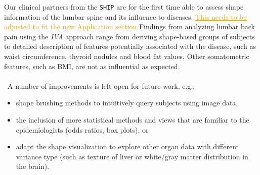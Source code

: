 \documentclass[journal]{style/vgtc} 			          %
\newcommand{\com}[1]{\textcolor{orange}{\uline{#1}}}
\begin{document}
Our clinical partners from the \texttt{SHIP} are for the first time able to assess shape information of the lumbar spine and its influence to diseases.
%
\com{This needs to be adjusted to fit the new Application section}
Findings from analyzing lumbar back pain using the \emph{IVA} approach range from deriving shape-based groups of subjects to detailed description of features potentially associated with the disease, such as waist circumference, thyroid nodules and blood fat values.
%
Other somatometric features, such as BMI, are not as influential as expected.
%
\\\\\
A number of improvements is left open for future work, e.g.,

\begin{itemize}
	\item shape brushing methods to intuitively query subjects using image data,
	\item the inclusion of more statistical methods and views that are familiar to the epidemiologists (odds ratios, box plots), or
	\item adapt the shape visualization to explore other organ data with different variance type (such as texture of liver or white/gray matter distribution in the brain).
\end{itemize}
\end{document}
